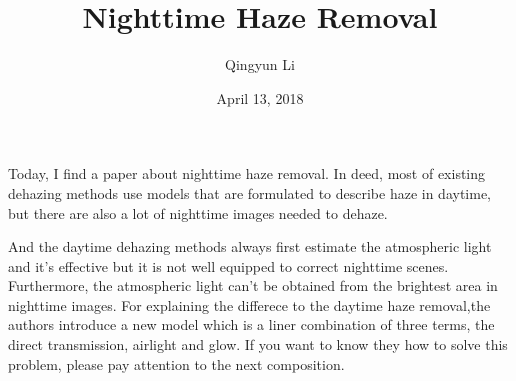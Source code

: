 \documentclass{article}
\author{Qingyun Li}
\date{April 13, 2018}
\title{Nighttime Haze Removal}
\begin{document}
\maketitle
\par Today, I find a paper about nighttime haze removal. In deed, most of existing dehazing methods use models that are formulated to describe haze in daytime, but there are also a lot of nighttime images needed to dehaze. 
\par And the daytime dehazing methods always first estimate the atmospheric light and it's effective but it is not well equipped to correct nighttime scenes. Furthermore, the atmospheric light can't be obtained from the brightest area in nighttime images. For explaining the differece to the daytime haze removal,the authors introduce a new model which is a liner combination of three terms, the direct transmission, airlight and glow. If you want to know they how to solve this problem, please pay attention to the next composition.
\end{document}
